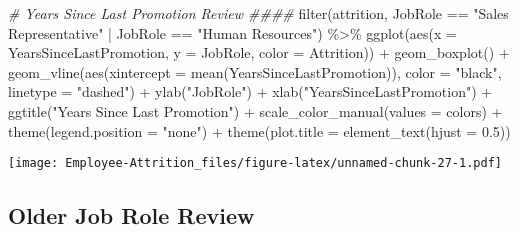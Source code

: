 \documentclass[
]{article}
\newenvironment{Shaded}{\begin{snugshade}}{\end{snugshade}}
\newcommand{\AttributeTok}[1]{\textcolor[rgb]{0.77,0.63,0.00}{#1}}
\newcommand{\CommentTok}[1]{\textcolor[rgb]{0.56,0.35,0.01}{\textit{#1}}}
\newcommand{\FloatTok}[1]{\textcolor[rgb]{0.00,0.00,0.81}{#1}}
\newcommand{\FunctionTok}[1]{\textcolor[rgb]{0.00,0.00,0.00}{#1}}
\newcommand{\NormalTok}[1]{#1}
\newcommand{\SpecialCharTok}[1]{\textcolor[rgb]{0.00,0.00,0.00}{#1}}
\newcommand{\StringTok}[1]{\textcolor[rgb]{0.31,0.60,0.02}{#1}}
\begin{document}
\begin{Shaded}
\begin{Highlighting}[]
\CommentTok{\# Years Since Last Promotion Review \#\#\#\#}
\FunctionTok{filter}\NormalTok{(attrition, JobRole }\SpecialCharTok{==} \StringTok{"Sales Representative"} \SpecialCharTok{|}\NormalTok{ JobRole }\SpecialCharTok{==} \StringTok{"Human Resources"}\NormalTok{) }\SpecialCharTok{\%\textgreater{}\%}
  \FunctionTok{ggplot}\NormalTok{(}\FunctionTok{aes}\NormalTok{(}\AttributeTok{x =}\NormalTok{ YearsSinceLastPromotion, }\AttributeTok{y =}\NormalTok{ JobRole, }\AttributeTok{color =}\NormalTok{ Attrition)) }\SpecialCharTok{+}
  \FunctionTok{geom\_boxplot}\NormalTok{() }\SpecialCharTok{+}
  \FunctionTok{geom\_vline}\NormalTok{(}\FunctionTok{aes}\NormalTok{(}\AttributeTok{xintercept =} \FunctionTok{mean}\NormalTok{(YearsSinceLastPromotion)), }\AttributeTok{color =} \StringTok{"black"}\NormalTok{, }\AttributeTok{linetype =} \StringTok{"dashed"}\NormalTok{) }\SpecialCharTok{+}
  \FunctionTok{ylab}\NormalTok{(}\StringTok{"JobRole"}\NormalTok{) }\SpecialCharTok{+}
  \FunctionTok{xlab}\NormalTok{(}\StringTok{"YearsSinceLastPromotion"}\NormalTok{) }\SpecialCharTok{+}
  \FunctionTok{ggtitle}\NormalTok{(}\StringTok{"Years Since Last Promotion"}\NormalTok{) }\SpecialCharTok{+}
  \FunctionTok{scale\_color\_manual}\NormalTok{(}\AttributeTok{values =}\NormalTok{ colors) }\SpecialCharTok{+}
  \FunctionTok{theme}\NormalTok{(}\AttributeTok{legend.position =} \StringTok{"none"}\NormalTok{) }\SpecialCharTok{+}
  \FunctionTok{theme}\NormalTok{(}\AttributeTok{plot.title =} \FunctionTok{element\_text}\NormalTok{(}\AttributeTok{hjust =} \FloatTok{0.5}\NormalTok{)) }
\end{Highlighting}
\end{Shaded}

\texttt{[image: Employee-Attrition\_files/figure-latex/unnamed-chunk-27-1.pdf]}

\hypertarget{older-job-role-review}{%
\subsection{Older Job Role Review}\label{older-job-role-review}}
\end{document}
